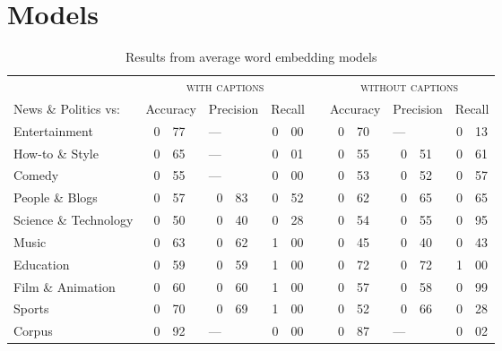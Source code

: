 \documentclass[letterpaper, 12pt]{article}
\begin{document}
\section{Models}

\begin{table}[H]
  \centering
  \caption*{Results from average word embedding models}
  \begin{tabular}{lr@{.}lr@{.}lr@{.}lp{1em}r@{.}lr@{.}lr@{.}l}
    \toprule
    & \multicolumn{6}{c}{\textsc{with captions}} & & \multicolumn{6}{c}{\textsc{without captions}} \\
    \cmidrule{2-7} \cmidrule{9-14}
    News \& Politics vs: & \multicolumn{2}{r}{Accuracy} & \multicolumn{2}{r}{Precision} & \multicolumn{2}{r}{Recall} & & \multicolumn{2}{r}{Accuracy} & \multicolumn{2}{r}{Precision} & \multicolumn{2}{r}{Recall} \\
    \midrule
    Entertainment         & 0 & 77  & \multicolumn{2}{l}{---} & 0 & 00 & & 0 & 70 &	\multicolumn{2}{l}{---} &	0 & 13 \\
    How-to \& Style       & 0 & 65	& \multicolumn{2}{l}{---}	& 0 & 01 & & 0 & 55 &	0 & 51                  &	0 & 61 \\
    Comedy                & 0 & 55	& \multicolumn{2}{l}{---}	& 0 & 00 & & 0 & 53 &	0 & 52                  &	0 & 57 \\
    People \& Blogs       & 0 & 57	& 0 & 83                  &	0 & 52 & & 0 & 62 &	0 & 65                  &	0 & 65 \\
    Science \& Technology & 0 & 50	& 0 & 40                  &	0 & 28 & & 0 & 54 &	0 & 55                  & 0 & 95 \\
    Music                 & 0 & 63	& 0 & 62                  &	1 & 00 & & 0 & 45 &	0 & 40                  &	0 & 43 \\
    Education             & 0 & 59	& 0 & 59                  &	1 & 00 & & 0 & 72 &	0 & 72                  &	1 & 00 \\
    Film \& Animation     & 0 & 60	& 0 & 60                  &	1 & 00 & & 0 & 57 &	0 & 58                  &	0 & 99 \\
    Sports                & 0 & 70	& 0 & 69                  & 1 & 00 & & 0 & 52 &	0 & 66                  &	0 & 28 \\
    \bottomrule
    Corpus                & 0 & 92  & \multicolumn{2}{l}{---} & 0 & 00 & & 0 & 87 &	\multicolumn{2}{l}{---}	& 0 & 02 \\
  \end{tabular}
\end{table}
\end{document}
